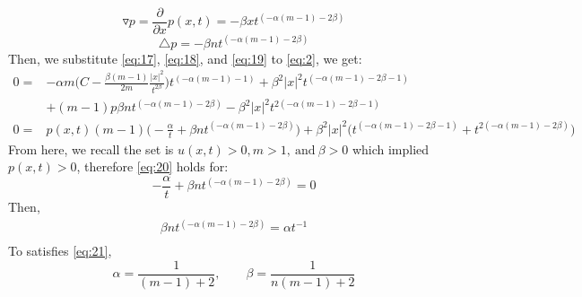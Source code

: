 \documentclass[a4paper,9pt]{article}
\begin{document}
\begin{enumerate}
\begin{enumerate}
\begin{equation}
		\triangledown p = \frac{\partial}{\partial x} p(x,t) = -\beta x t^{(-\alpha(m-1)-2\beta)}
		\end{equation}
		\begin{equation}\label{eq:19}
		\triangle p = - \beta n t^{(-\alpha(m-1)-2\beta)}
		\end{equation}
		Then, we substitute \eqref{eq:17}, \eqref{eq:18}, and \eqref{eq:19} to \eqref{eq:2}, we get:
		\begin{equation}\label{eq:20}
		\begin{aligned}
		0=&-\alpha m \bigg( C- \frac{\beta(m-1)}{2m}\frac{|x|^2}{t^{2\beta}} \bigg)t^{(-\alpha(m-1)-1)}  + \beta^2 |x|^2t^{(-\alpha(m-1)-2\beta-1)}\\
		&+(m-1)p\beta n t^{(-\alpha(m-1)-2\beta)} - \beta^2 |x|^2 t^{2(-\alpha (m-1)-2\beta-1)}\\
		0=&p(x,t)(m-1)\bigg( -\frac{\alpha}{t} + \beta n t ^{(-\alpha(m-1)-2\beta)} \bigg) + \beta^2 |x|^2 \bigg( t ^{(-\alpha(m-1)-2\beta -1)} + t^{2(-\alpha(m-1)-2\beta)} \bigg)
		\end{aligned}
		\end{equation}
		From here, we recall the set is $u(x,t) > 0, m>1,\ \text{and}\ \beta>0$ which implied $p(x,t) > 0$,
		therefore \eqref{eq:20} holds for:
		$$-\frac{\alpha}{t} + \beta n t ^{(-\alpha(m-1)-2\beta)} = 0$$
		Then,
		\begin{equation}\label{eq:21}
		\begin{aligned}
		\beta n t ^{(-\alpha(m-1)-2\beta)} = \alpha t^{-1}\\
		\end{aligned}
		\end{equation}
		To satisfies \eqref{eq:21},
		\begin{equation}\label{eq:22}
		\alpha = \frac{1}{(m-1)+2}, \qquad \beta = \frac{1}{n(m-1)+2}
		\end{equation}
		

\end{enumerate}
\end{enumerate}
\end{document}
